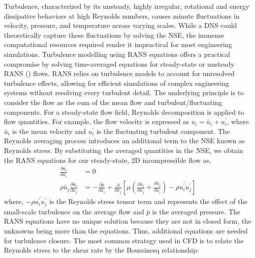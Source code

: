 Turbulence, characterized by its unsteady, highly irregular, rotational and energy dissipative behaviors at high Reynolds numbers, causes minute fluctuations in velocity, pressure, and temperature across varying scales. While a DNS could theoretically capture these fluctuations by solving the NSE, the immense computational resources required render it impractical for most engineering simulations. 
Turbulence modelling using RANS equations offers a practical compromise by solving time-averaged equations for steady-state or unsteady RANS () flows. RANS relies on turbulence models to account for unresolved turbulence effects, allowing for efficient simulations of complex engineering systems without resolving every turbulent detail. The underlying principle is to consider the flow as the sum of the mean flow and turbulent/fluctuating components. For a steady-state flow field, Reynolds decomposition is applied to flow quantities. For example, the flow velocity is expressed as $u_i = \bar{u}_i + u_i^{\prime}$, where $\bar{u}_i$ is the mean velocity and $u_i^{\prime}$ is the fluctuating turbulent component. The Reynolds averaging process introduces an additional term to the NSE known as Reynolds stress. By substituting the averaged quantities in the \gls{NSE}, we obtain the \gls{RANS} equations for our steady-state, 2D incompressible flow as,
\begin{equation}
  \begin{aligned}
  \frac{\partial \bar{u}_i}{\partial x_i}&=0 \\
  \rho \bar{u}_j \frac{\partial \bar{u}_i}{\partial x_j}&= - \frac{\partial \bar{p}}{\partial x_i} + \frac{\partial}{\partial x_j}     \left[ \mu \left(\frac{\partial \bar{u}_i}{\partial x_j}+\frac{\partial \bar{u}_j}{\partial x_i}\right) - \rho \overline{u_i^{\prime} u_j^{\prime}} \right] 
  \end{aligned}
\end{equation}
where, $- \rho \overline{u_i^{\prime} u_j^{\prime}}$ is the Reynolds stress tensor term and represents the effect of the small-scale turbulence on the average flow and $\bar{p}$ is the averaged pressure. The RANS equations have no unique solution because they are not in closed form, the unknowns being more than the equations. Thus, additional equations are needed for turbulence closure. The most common strategy used in CFD is to relate the Reynolds stress to the shear rate by the Boussinesq relationship:
